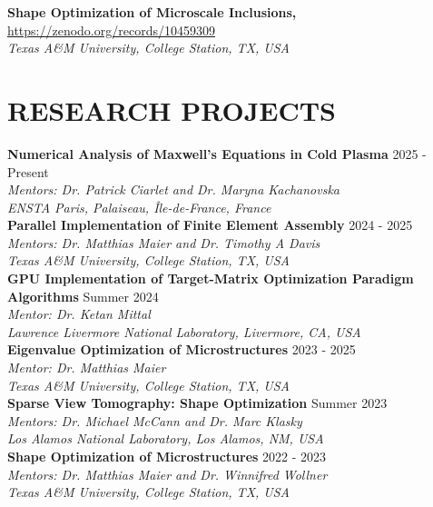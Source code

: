 \documentclass[10pt,a4paper,roman]{moderncv}
\begin{document}
\textbf{Shape Optimization of Microscale Inclusions,}
\href{https://zenodo.org/records/10459309}
{https://zenodo.org/records/10459309}\\
\textit{Texas A\&M University, College Station, TX, USA}\\


 
\section{RESEARCH PROJECTS}

\textbf{Numerical Analysis of Maxwell's Equations in Cold Plasma}
\hfill 2025 - Present\\
\textit{Mentors: Dr. Patrick Ciarlet and Dr. Maryna Kachanovska}\\
\textit{ENSTA Paris, Palaiseau, Île-de-France, France}\\

\textbf{Parallel Implementation of Finite Element Assembly}
\hfill 2024 - 2025\\
\textit{Mentors: Dr. Matthias Maier and Dr. Timothy A Davis}\\
\textit{Texas A\&M University, College Station, TX, USA}\\

\textbf{GPU Implementation of Target-Matrix Optimization Paradigm Algorithms}
\hfill Summer 2024\\
\textit{Mentor: Dr. Ketan Mittal}\\
\textit{Lawrence Livermore National Laboratory, Livermore, CA, USA}\\

\textbf{Eigenvalue Optimization of Microstructures}
\hfill 2023 - 2025\\
\textit{Mentor: Dr. Matthias Maier}\\
\textit{Texas A\&M University, College Station, TX, USA}\\

\textbf{Sparse View Tomography: Shape Optimization}
\hfill Summer 2023\\
\textit{Mentors: Dr. Michael McCann and Dr. Marc Klasky}\\
\textit{Los Alamos National Laboratory, Los Alamos, NM, USA}\\

\textbf{Shape Optimization of Microstructures}
\hfill 2022 - 2023\\
\textit{Mentors: Dr. Matthias Maier and Dr. Winnifred Wollner}\\
\textit{Texas A\&M University, College Station, TX, USA}\\
\end{document}

